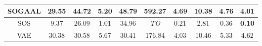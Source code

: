 \begin{table*}[!b]
\begin{tabular}{|c|c|c|c|c|c|c|c|c|c|}
\hline
                        SOGAAL &                  29.55 &                       44.72 &                   5.20 &                        48.79 &                 592.27 &                        4.69 &                    10.38 &                  4.76 &                   4.01 \\
\hline
                        SOS &                   9.37 &                       26.09 &                   1.01 &                        34.96 &            \textit{TO} &                        0.21 &                     2.81 &                  0.36 &          \textbf{0.10} \\
\hline
                        VAE &                  30.38 &                       30.58 &                   5.67 &                        30.41 &                 176.84 &                        4.03 &                    10.46 &                  5.33 &                   4.62 \\
\hline
\end{tabular}
\end{table*}






